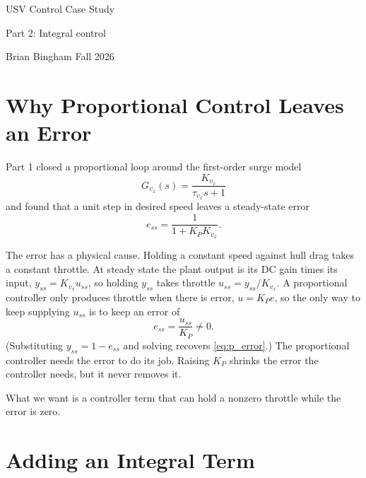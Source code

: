 \documentclass[12pt]{article}
\begin{document}
\begin{center}
   \setlength{\parskip}{0pt}
  {\LARGE USV Control Case Study\par}
  {\Large Part 2: Integral control\par}
  \vspace{0.8em}
  Brian Bingham \quad\textbar\quad Fall 2026
\end{center}

\section{Why Proportional Control Leaves an Error}
\label{sec:why_error}

Part 1 closed a proportional loop around the first-order surge model
\begin{equation}
  G_{v_x}(s) = \frac{K_{v_x}}{\tau_{v_x} s + 1}
  \label{eq:surge_plant}
\end{equation}
and found that a unit step in desired speed leaves a steady-state error
\begin{equation}
  e_{ss} = \frac{1}{1 + K_P K_{v_x}}.
  \label{eq:p_error}
\end{equation}

The error has a physical cause.  Holding a constant speed against hull drag takes a constant throttle.  At steady state the plant output is its DC gain times its input, $y_{ss} = K_{v_x} u_{ss}$, so holding $y_{ss}$ takes throttle $u_{ss} = y_{ss}/K_{v_x}$.  A proportional controller only produces throttle when there is error, $u = K_P e$, so the only way to keep supplying $u_{ss}$ is to keep an error of
\[
  e_{ss} = \frac{u_{ss}}{K_P} \neq 0.
\]
(Substituting $y_{ss} = 1 - e_{ss}$ and solving recovers \cref{eq:p_error}.)  The proportional controller needs the error to do its job.  Raising $K_P$ shrinks the error the controller needs, but it never removes it.

What we want is a controller term that can hold a nonzero throttle while the error is zero.

\section{Adding an Integral Term}
\label{sec:pi}
\end{document}
